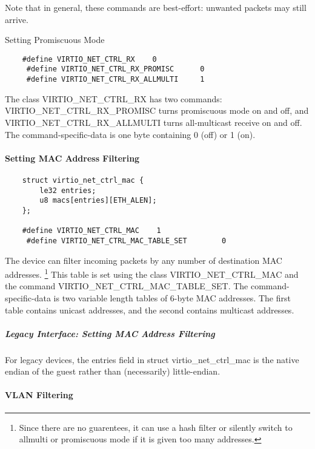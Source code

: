Note that in general, these commands are best-effort: unwanted
packets may still arrive.

Setting Promiscuous Mode

\begin{lstlisting}
	#define VIRTIO_NET_CTRL_RX    0
	 #define VIRTIO_NET_CTRL_RX_PROMISC      0
	 #define VIRTIO_NET_CTRL_RX_ALLMULTI     1
\end{lstlisting}

The class VIRTIO_NET_CTRL_RX has two commands:
VIRTIO_NET_CTRL_RX_PROMISC turns promiscuous mode on and off, and
VIRTIO_NET_CTRL_RX_ALLMULTI turns all-multicast receive on and
off. The command-specific-data is one byte containing 0 (off) or
1 (on).

\paragraph{Setting MAC Address Filtering}\label{sec:Device Types / Network Device / Device Operation / Control Virtqueue / Setting MAC Address Filtering}

\begin{lstlisting}
	struct virtio_net_ctrl_mac {
		le32 entries;
		u8 macs[entries][ETH_ALEN];
	};

	#define VIRTIO_NET_CTRL_MAC    1
	 #define VIRTIO_NET_CTRL_MAC_TABLE_SET        0
\end{lstlisting}

The device can filter incoming packets by any number of destination
MAC addresses.
\footnote{Since there are no guarentees, it can use a hash filter or
silently switch to allmulti or promiscuous mode if it is given too
many addresses.
} This table is set using the class
VIRTIO_NET_CTRL_MAC and the command VIRTIO_NET_CTRL_MAC_TABLE_SET. The
command-specific-data is two variable length tables of 6-byte MAC
addresses. The first table contains unicast addresses, and the second
contains multicast addresses.

\subparagraph{Legacy Interface: Setting MAC Address Filtering}\label{sec:Device Types / Network Device / Device Operation / Control Virtqueue / Setting MAC Address Filtering / Legacy Interface: Setting MAC Address Filtering}
For legacy devices, the entries field in struct virtio_net_ctrl_mac is the
native endian of the guest rather than (necessarily) little-endian.

\paragraph{VLAN Filtering}\label{sec:Device Types / Network Device / Device Operation / Control Virtqueue / VLAN Filtering}

